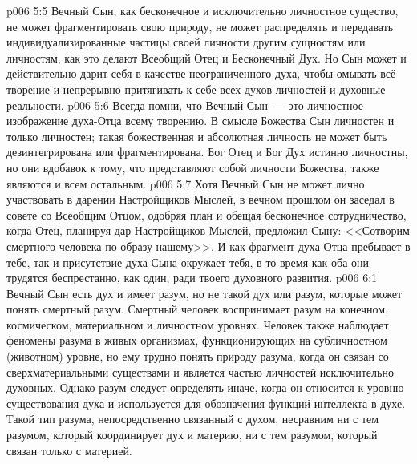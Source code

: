 \vs p006 5:5 Вечный Сын, как бесконечное и исключительно личностное существо, не может фрагментировать свою природу, не может распределять и передавать индивидуализированные частицы своей личности другим сущностям или личностям, как это делают Всеобщий Отец и Бесконечный Дух. Но Сын может и действительно дарит себя в качестве неограниченного духа, чтобы омывать всё творение и непрерывно притягивать к себе всех духов\hyp{}личностей и духовные реальности.
\vs p006 5:6 Всегда помни, что Вечный Сын~--- это личностное изображение духа\hyp{}Отца всему творению. В смысле Божества Сын личностен и только личностен; такая божественная и абсолютная личность не может быть дезинтегрирована или фрагментирована. Бог Отец и Бог Дух истинно личностны, но они вдобавок к тому, что представляют собой личности Божества, также являются и всем остальным.
\vs p006 5:7 Хотя Вечный Сын не может лично участвовать в дарении Настройщиков Мыслей, в вечном прошлом он заседал в совете со Всеобщим Отцом, одобряя план и обещая бесконечное сотрудничество, когда Отец, планируя дар Настройщиков Мыслей, предложил Сыну: <<Сотворим смертного человека по образу нашему>>. И как фрагмент духа Отца пребывает в тебе, так и присутствие духа Сына окружает тебя, в то время как оба они трудятся беспрестанно, как один, ради твоего духовного развития.
\vs p006 6:1 Вечный Сын есть дух и имеет разум, но не такой дух или разум, которые может понять смертный разум. Смертный человек воспринимает разум на конечном, космическом, материальном и личностном уровнях. Человек также наблюдает феномены разума в живых организмах, функционирующих на субличностном (животном) уровне, но ему трудно понять природу разума, когда он связан со сверхматериальными существами и является частью личностей исключительно духовных. Однако разум следует определять иначе, когда он относится к уровню существования духа и используется для обозначения функций интеллекта в духе. Такой тип разума, непосредственно связанный с духом, несравним ни с тем разумом, который координирует дух и материю, ни с тем разумом, который связан только с материей.
